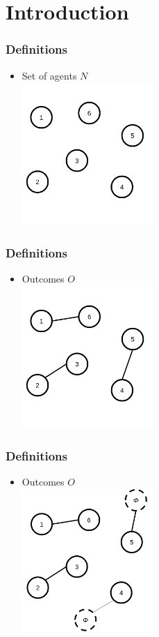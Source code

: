 \section{Introduction}

\begin{frame}
\frametitle{Definitions}
\begin{itemize}
\item  Set of agents $N$ \\
\centering
\includegraphics[width=5cm]{img/intro/agents.png}
\end{itemize}
\end{frame}



\begin{frame}
\frametitle{Definitions}
\begin{itemize}
\item Outcomes $O$ \\
\centering
\includegraphics[width=5cm]{img/intro/agents_matched.png}
\end{itemize}
\end{frame}

\begin{frame}
\frametitle{Definitions}
\begin{itemize}
\item Outcomes $O$ \\
\centering
\includegraphics[width=5cm]{img/intro/agents_unmatched.png}
\end{itemize}
\end{frame}


